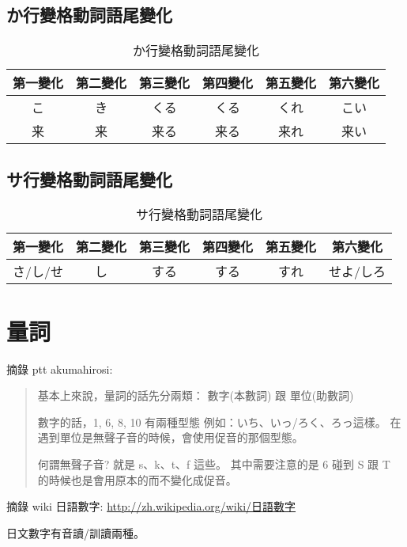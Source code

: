 \documentclass[12pt]{article}
\begin{document}
\begin{CJK}{UTF8}{cybercjk}
\subsection{か行變格動詞語尾變化}
\begin{table}[htdp]
\begin{tabular}{cccccc}
\hline
第一變化 & 第二變化 & 第三變化 & 第四變化 & 第五變化 & 第六變化 \\
\hline
こ & き & くる & くる & くれ& こい \\
来 & 来 & 来る & 来る & 来れ& 来い \\
\hline
\end{tabular}
\caption{か行變格動詞語尾變化}
\end{table}

\subsection{サ行變格動詞語尾變化}
\begin{table}[htdp]
\begin{tabular}{cccccc}
\hline
第一變化 & 第二變化 & 第三變化 & 第四變化 & 第五變化 & 第六變化 \\
\hline
さ/し/せ & し & する & する & すれ& せよ/しろ \\
\hline
\end{tabular}
\caption{サ行變格動詞語尾變化}
\end{table}

\section{量詞}

摘錄 ptt akumahirosi:
\begin{quote}
  基本上來說，量詞的話先分兩類： 數字(本數詞)  跟  單位(助數詞)

  數字的話，1, 6, 8, 10 有兩種型態
  例如：いち、いっ/ろく、ろっ這樣。
  在遇到單位是無聲子音的時候，會使用促音的那個型態。

  何謂無聲子音? 就是 s、k、t、f 這些。
  其中需要注意的是 6 碰到 S 跟 T 的時候也是會用原本的而不變化成促音。
\end{quote}

摘錄 wiki 日語數字: \href{http://zh.wikipedia.org/wiki/%E6%97%A5%E8%AA%9E%E6%95%B8%E5%AD%97}{http://zh.wikipedia.org/wiki/日語數字}

日文數字有音讀/訓讀兩種。


\end{CJK}
\end{document}
